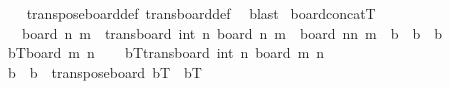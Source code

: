 \begin{isabellebody}
%
\isadelimproof
\ \ %
\endisadelimproof
%
\isatagproof
{}\isamarkupfalse%
\ transpose{\isacharunderscore}{\kern0pt}board{\isacharunderscore}{\kern0pt}def\ trans{\isacharunderscore}{\kern0pt}board{\isacharunderscore}{\kern0pt}def\ \isamarkupfalse%
\ blast%
\endisatagproof
{\isafoldproof}%
%
\isadelimproof
\isanewline
%
\endisadelimproof
\isanewline
{}\isamarkupfalse%
\ board{\isacharunderscore}{\kern0pt}concatT{\isacharcolon}{\kern0pt}\ \isanewline
\ \ \ {\isachardoublequoteopen}board\ n\ m\ {\isasymunion}\ trans{\isacharunderscore}{\kern0pt}board\ {\isacharparenleft}{\kern0pt}int\ n\ {\isacharparenleft}{\kern0pt}board\ n\ m{\isacharparenright}{\kern0pt}\ {\isacharequal}{\kern0pt}\ board\ {\isacharparenleft}{\kern0pt}nn\ m{\isachardoublequoteclose}\ {\isacharparenleft}{\kern0pt}\ {\isachardoublequoteopen}{\isacharquery}{\kern0pt}b\ {\isasymunion}\ {\isacharquery}{\kern0pt}b\ {\isacharequal}{\kern0pt}\ {\isacharquery}{\kern0pt}b{\isachardoublequoteclose}{\isacharparenright}{\kern0pt}\isanewline
%
\isadelimproof
%
\endisadelimproof
%
\isatagproof
{}\isamarkupfalse%
\ {\isacharminus}{\kern0pt}\isanewline
\ \ \isamarkupfalse%
\ {\isacharquery}{\kern0pt}bT{\isacharequal}{\kern0pt}{\isachardoublequoteopen}board\ m\ n\isanewline
\ \ \isamarkupfalse%
\ {\isacharquery}{\kern0pt}bT{\isacharequal}{\kern0pt}{\isachardoublequoteopen}trans{\isacharunderscore}{\kern0pt}board\ {\isacharparenleft}{\kern0pt}{}{\isacharcomma}{\kern0pt}int\ n\ {\isacharparenleft}{\kern0pt}board\ m\ n\isanewline
\ \ \isamarkupfalse%
\ {\isachardoublequoteopen}{\isacharquery}{\kern0pt}b\ {\isasymunion}\ {\isacharquery}{\kern0pt}b\ {\isacharequal}{\kern0pt}\ transpose{\isacharunderscore}{\kern0pt}board\ {\isacharparenleft}{\kern0pt}{\isacharquery}{\kern0pt}bT\ {\isasymunion}\ {\isacharquery}{\kern0pt}bT{\isacharparenright}{\kern0pt}\ {\isachardoublequoteclose}\isanewline

\end{isabellebody}
